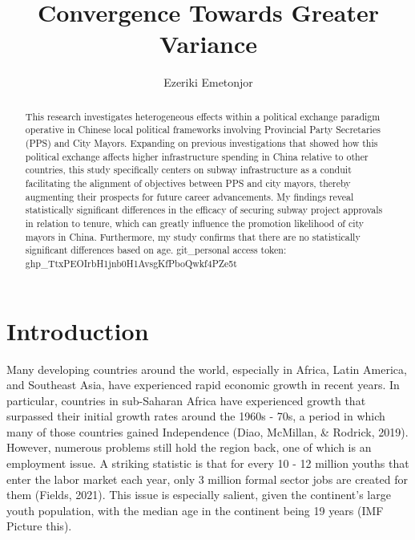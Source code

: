 \documentclass[
  12pt,
  letterpaper,
  DIV=11,
  numbers=noendperiod]{scrartcl}
\title{Convergence Towards Greater Variance}
\author{Ezeriki Emetonjor}
\date{}
\begin{document}
\maketitle
\begin{abstract}
This research investigates heterogeneous effects within a political
exchange paradigm operative in Chinese local political frameworks
involving Provincial Party Secretaries (PPS) and City Mayors. Expanding
on previous investigations that showed how this political exchange
affects higher infrastructure spending in China relative to other
countries, this study specifically centers on subway infrastructure as a
conduit facilitating the alignment of objectives between PPS and city
mayors, thereby augmenting their prospects for future career
advancements. My findings reveal statistically significant differences
in the efficacy of securing subway project approvals in relation to
tenure, which can greatly influence the promotion likelihood of city
mayors in China. Furthermore, my study confirms that there are no
statistically significant differences based on age. git\_personal access
token: ghp\_TtxPEOIrbH1jnb0H1AvsgKfPboQwkf4PZe5t
\end{abstract}
\ifdefined\Shaded\renewenvironment{Shaded}{\begin{tcolorbox}[breakable, borderline west={3pt}{0pt}{shadecolor}, enhanced, interior hidden, frame hidden, boxrule=0pt, sharp corners]}{\end{tcolorbox}}\fi

\newpage{}

\hypertarget{introduction}{%
\section{Introduction}\label{introduction}}

Many developing countries around the world, especially in Africa, Latin
America, and Southeast Asia, have experienced rapid economic growth in
recent years. In particular, countries in sub-Saharan Africa have
experienced growth that surpassed their initial growth rates around the
1960s - 70s, a period in which many of those countries gained
Independence (Diao, McMillan, \& Rodrick, 2019). However, numerous
problems still hold the region back, one of which is an employment
issue. A striking statistic is that for every 10 - 12 million youths
that enter the labor market each year, only 3 million formal sector jobs
are created for them (Fields, 2021). This issue is especially salient,
given the continent's large youth population, with the median age in the
continent being 19 years (IMF Picture this).
\end{document}
